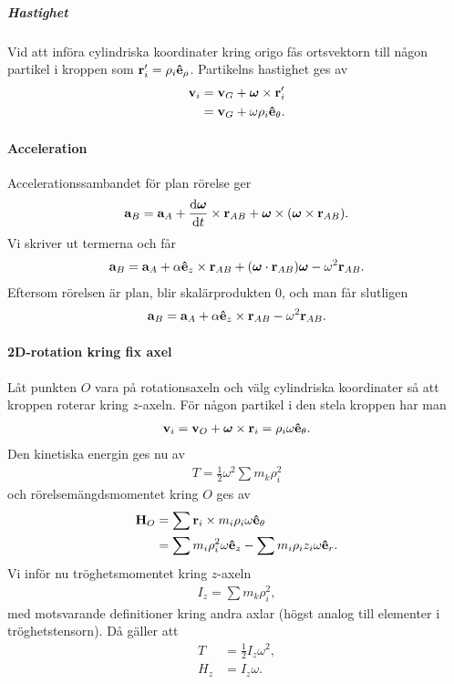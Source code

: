 \subparagraph{Hastighet}
Vid att införa cylindriska koordinater kring origo fås ortsvektorn till någon partikel i kroppen som $\vb{r}_{i}' = \rho_{i}\vu{e}_{\rho}$. Partikelns hastighet ges av
\begin{align*}
	\vb{v}_{i} &= \vb{v}_{G} + \vb*{\omega}\times\vb{r}_{i}' \\
	           &= \vb{v}_{G} + \omega\rho_{i}\vu{e}_{\theta}.
\end{align*}

\paragraph{Acceleration}
Accelerationssambandet för plan rörelse ger
\begin{align*}
	\vb{a}_{B} = \vb{a}_{A} + \dv{\vb*{\omega}}{t}\times\vb{r}_{AB} + \vb*{\omega}\times(\vb*{\omega}\times\vb{r}_{AB}).
\end{align*}
Vi skriver ut termerna och får
\begin{align*}
	\vb{a}_{B} = \vb{a}_{A} + \alpha\vu{e}_{z}\times\vb{r}_{AB} + (\vb*{\omega}\cdot\vb{r}_{AB})\vb*{\omega} - \omega^2\vb{r}_{AB}.
\end{align*}
Eftersom rörelsen är plan, blir skalärprodukten $0$, och man får slutligen
\begin{align*}
	\vb{a}_{B} = \vb{a}_{A} + \alpha\vu{e}_{z}\times\vb{r}_{AB} - \omega^2\vb{r}_{AB}.
\end{align*}

\paragraph{2D-rotation kring fix axel}
Låt punkten $O$ vara på rotationsaxeln och välg cylindriska koordinater så att kroppen roterar kring $z$-axeln. För någon partikel i den stela kroppen har man
\begin{align*}
	\vb{v}_{i} = \vb{v}_{O} + \vb*{\omega}\times\vb{r}_{i} = \rho_{i}\omega\vu{e}_{\theta}.
\end{align*}
Den kinetiska energin ges nu av
\begin{align*}
	T = \frac{1}{2}\omega^2\sum m_{k}\rho_{i}^2
\end{align*}
och rörelsemängdsmomentet kring $O$ ges av
\begin{align*}
	\vb{H}_{O} &= \sum \vb{r}_{i}\times m_{i}\rho_{i}\omega\vu{e}_{\theta} \\
	           &= \sum m_{i}\rho_{i}^2\omega\vu{e}_{z} - \sum m_{i}\rho_{i}z_{i}\omega\vu{e}_{r}.
\end{align*}
Vi inför nu tröghetsmomentet kring $z$-axeln
\begin{align*}
	I_{z} = \sum m_{k}\rho_{i}^2,
\end{align*}
med motsvarande definitioner kring andra axlar (högst analog till elementer i tröghetstensorn). Då gäller att
\begin{align*}
	T     &= \frac{1}{2}I_{z}\omega^2, \\
	H_{z} &= I_{z}\omega.
\end{align*}

